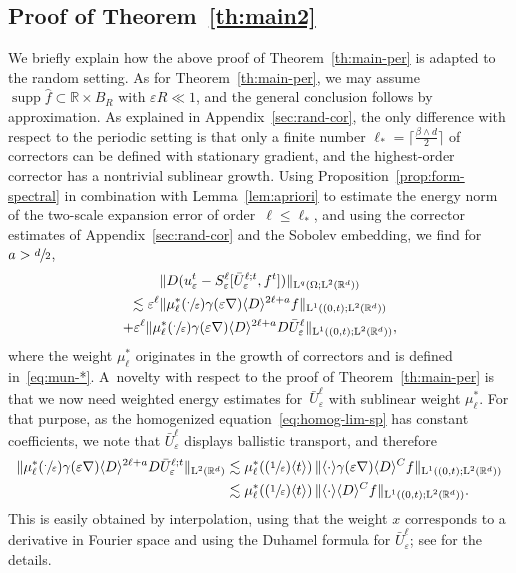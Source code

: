 \documentclass[10pt]{amsart}
\newcommand{\Psfrac}[2]{(\sfrac{#1}{#2})}
\theoremstyle{plain}
\theoremstyle{definition}
\numberwithin{equation}{section}
\newcommand{\e}{\varepsilon}
\newcommand{\R}{\mathbb R}
\newcommand{\Ld}{\operatorname{L}}
\newcommand{\supp}{\operatorname{supp}}
\begin{document}
\subsection{Proof of Theorem~\ref{th:main2}}\label{sec:proof-random}
We briefly explain how the above proof of Theorem~\ref{th:main-per} is adapted to the random setting.
As for Theorem~\ref{th:main-per}, we may assume $\supp\hat f\subset\R\times B_R$ with $\e R\ll1$, and the general conclusion follows by approximation.
As explained in Appendix~\ref{sec:rand-cor}, the only difference with respect to the periodic setting is that only a finite number $\ell_*=\lceil\frac{\beta\wedge d}2\rceil$ of correctors can be defined with stationary gradient, and the highest-order corrector has a nontrivial sublinear growth.
Using Proposition~\ref{prop:form-spectral} in combination with Lemma~\ref{lem:apriori} to estimate the energy norm of the two-scale expansion error of order~$\ell\le\ell_*$, and using the corrector estimates of Appendix~\ref{sec:rand-cor} and the Sobolev embedding, we find for $a>\sfrac d2$,
\begin{multline*}
\|D(u_\e^t-S_\e^{\ell}[\bar U_\e^{\ell;t},f^t])\|_{\Ld^q(\Omega;\Ld^2(\R^d))}\\
\lesssim
\e^{\ell}\|\mu_\ell^*(\sfrac\cdot\e)\gamma(\e\nabla)\langle D\rangle^{2\ell+a}f\|_{\Ld^1((0,t);\Ld^2(\R^d))}\\
+\e^{\ell}\|\mu_\ell^*(\sfrac\cdot\e)\gamma(\e\nabla)\langle D\rangle^{2\ell+a}D\bar U_\e^{\ell}\|_{\Ld^1((0,t);\Ld^2(\R^d))},
\end{multline*}
where the weight $\mu_\ell^*$ originates in the growth of correctors and is defined in~\eqref{eq:mun-*}.
A~novelty with respect to the proof of Theorem~\ref{th:main-per} is that we now need weighted energy estimates for~$\bar U_\e^{\ell}$ with sublinear weight $\mu_\ell^*$.
For that purpose, as the homogenized equation~\eqref{eq:homog-lim-sp} has constant coefficients,
we note that $\bar U_\e^{\ell}$ displays ballistic transport, and therefore
\begin{align*}
\|\mu_\ell^*(\sfrac\cdot\e)\gamma(\e\nabla)\langle D\rangle^{2\ell+a}D\bar U_\e^{\ell;t}\|_{\Ld^2(\R^d)}
&\lesssim\mu_\ell^*(\Psfrac{1}\e\langle t\rangle)\,\|\langle\cdot\rangle\gamma(\e\nabla)\langle D\rangle^{C}f\|_{\Ld^1((0,t);\Ld^2(\R^d))}\\
&\lesssim\mu_\ell^*(\Psfrac{1}\e\langle t\rangle)\,\|\langle\cdot\rangle\langle D\rangle^{C}f\|_{\Ld^1((0,t);\Ld^2(\R^d))}.
\end{align*}
This is easily obtained by interpolation, using that the weight $x$ corresponds to a derivative in Fourier space and using the Duhamel formula for $\bar U_\e^{\ell}$; see \eg \cite[Proof of Prop.\,3]{BG} for the details.
\end{document}
